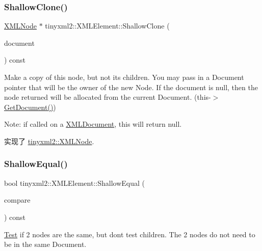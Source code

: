 \subsubsection{\texorpdfstring{Shallow\+Clone()}{ShallowClone()}}
{\footnotesize\ttfamily \hyperlink{classtinyxml2_1_1_x_m_l_node}{X\+M\+L\+Node} $\ast$ tinyxml2\+::\+X\+M\+L\+Element\+::\+Shallow\+Clone (\begin{DoxyParamCaption}\item[{\hyperlink{classtinyxml2_1_1_x_m_l_document}{X\+M\+L\+Document} $\ast$}]{document }\end{DoxyParamCaption}) const\hspace{0.3cm}{\ttfamily [virtual]}}

Make a copy of this node, but not its children. You may pass in a Document pointer that will be the owner of the new Node. If the \textquotesingle{}document\textquotesingle{} is null, then the node returned will be allocated from the current Document. (this-\/$>$\hyperlink{classtinyxml2_1_1_x_m_l_node_af343d1ef0b45c0020e62d784d7e67a68}{Get\+Document()})

Note\+: if called on a \hyperlink{classtinyxml2_1_1_x_m_l_document}{X\+M\+L\+Document}, this will return null. 

实现了 \hyperlink{classtinyxml2_1_1_x_m_l_node_a8402cbd3129d20e9e6024bbcc0531283}{tinyxml2\+::\+X\+M\+L\+Node}.

\mbox{\label{classtinyxml2_1_1_x_m_l_element_a61ffd7bf918a9db4aa6203d855ac5ec2}} 
\subsubsection{\texorpdfstring{Shallow\+Equal()}{ShallowEqual()}}
{\footnotesize\ttfamily bool tinyxml2\+::\+X\+M\+L\+Element\+::\+Shallow\+Equal (\begin{DoxyParamCaption}\item[{const \hyperlink{classtinyxml2_1_1_x_m_l_node}{X\+M\+L\+Node} $\ast$}]{compare }\end{DoxyParamCaption}) const\hspace{0.3cm}{\ttfamily [virtual]}}

\hyperlink{class_test}{Test} if 2 nodes are the same, but don\textquotesingle{}t test children. The 2 nodes do not need to be in the same Document.

